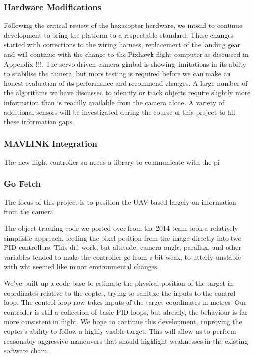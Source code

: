 \documentclass[a4paper, 11pt, titlepage]{article}
\begin{document}
    \subsubsection{Hardware Modifications}
      Following the critical review of the hexacopter hardware, we intend to continue development to bring the platform to a respectable standard. These changes started with corrections to the wiring harness, replacement of the landing gear and will continue with the change to the Pixhawk flight computer as discussed in Appendix !!!.
      The servo driven camera gimbal is showing limitations in its abilty to stabilise the camera, but more testing is required before we can make an honest evaluation of its performance and recommend changes.
      A large number of the algorithms we have discussed to identify or track objects require slightly more information than is readilly available from the camera alone.  A variety of additional sensors will be investigated during the course of this project to fill these information gaps.

    \subsubsection{MAVLINK Integration}

      The new flight controller su needs a library to communicate with the pi

    \subsubsection{Go Fetch}
      The focus of this project is to position the UAV based largely on information from the camera.  

      The object tracking code we ported over from the 2014 team took a relatively simplistic approach, feeding the pixel position from the image directly into two PID controllers.  This did work, but altitude, camera angle, parallax, and other variables tended to make the controller go from a-bit-weak, to utterly unstable with wht seemed like minor environmental changes.

      We've built up a code-base to estimate the physical position of the target in coordinates relative to the copter, trying to sanitize the inputs to the control loop. The control loop now takes inputs of the target coordinates in metres.  Our controller is still a collection of basic PID loops, but already, the behaviour is far more consistent in flight.  We hope to continue this development, improving the copter's ability to follow a highly visible target.  This will allow us to perform reasonably aggressive maneuvers that should highlight weaknesses in the existing software chain.
\end{document}
